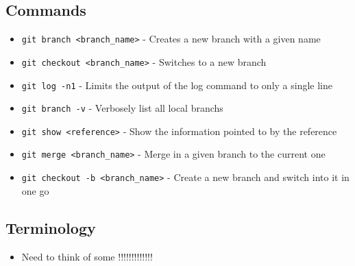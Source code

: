 \subsection{Commands}
\begin{itemize}
\item\texttt{git branch <branch\_name>} - Creates a new branch with a given name

\item\texttt{git checkout <branch\_name>} - Switches to a new branch

\item\texttt{git log -n1} - Limits the output of the log command to only a single line

\item\texttt{git branch -v} - Verbosely list all local branchs

\item\texttt{git show <reference>} - Show the information pointed to by the reference

\item\texttt{git merge <branch\_name>} - Merge in a given branch to the current one

\item\texttt{git checkout -b <branch\_name>} - Create a new branch and switch into it in one go

\end{itemize}

\subsection{Terminology}
\begin{itemize}
\item Need to think of some !!!!!!!!!!!!!
\end{itemize}
